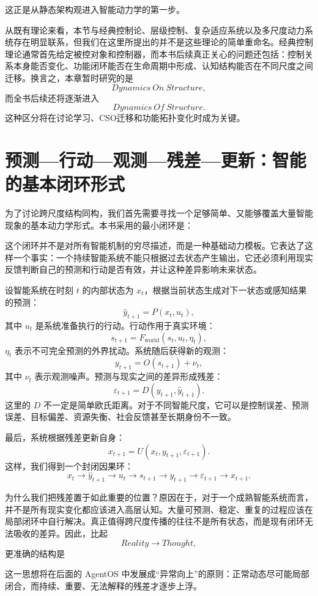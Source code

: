 这正是从静态架构观进入智能动力学的第一步。

从既有理论来看，本节与经典控制论、层级控制、复杂适应系统以及多尺度动力系统存在明显联系，但我们在这里所提出的并不是这些理论的简单重命名。经典控制理论通常首先给定被控对象和控制器，而本书后续真正关心的问题还包括：控制关系本身能否变化、功能闭环能否在生命周期中形成、认知结构能否在不同尺度之间迁移。换言之，本章暂时研究的是
\[
Dynamics\ On\ Structure,
\]
而全书后续还将逐渐进入
\[
Dynamics\ Of\ Structure.
\]
这种区分将在讨论学习、CSO迁移和功能拓扑变化时成为关键。

\section{预测---行动---观测---残差---更新：智能的基本闭环形式}

为了讨论跨尺度结构同构，我们首先需要寻找一个足够简单、又能够覆盖大量智能现象的基本动力学形式。本书采用的最小闭环是：
\begin{statementbox}
\centering
{}
\end{statementbox}
这个闭环并不是对所有智能机制的穷尽描述，而是一种基础动力模板。它表达了这样一个事实：一个持续智能系统不能只根据过去状态产生输出，它还必须利用现实反馈判断自己的预测和行动是否有效，并让这种差异影响未来状态。

设智能系统在时刻 $t$ 的内部状态为 $x_t$，根据当前状态生成对下一状态或感知结果的预测：
\[
\hat{y}_{t+1}
=
P(x_t,u_t),
\]
其中 $u_t$ 是系统准备执行的行动。行动作用于真实环境：
\[
s_{t+1}
=
F_{\mathrm{world}}(s_t,u_t,\eta_t),
\]
$\eta_t$ 表示不可完全预测的外界扰动。系统随后获得新的观测：
\[
y_{t+1}
=
O(s_{t+1})+\nu_t,
\]
其中 $\nu_t$ 表示观测噪声。预测与现实之间的差异形成残差：
\[
\varepsilon_{t+1}
=
D
\left(
y_{t+1},
\hat{y}_{t+1}
\right).
\]
这里的 $D$ 不一定是简单欧氏距离。对于不同智能尺度，它可以是控制误差、预测误差、目标偏差、资源失衡、社会反馈甚至长期身份不一致。

最后，系统根据残差更新自身：
\[
x_{t+1}
=
U(x_t,y_{t+1},\varepsilon_{t+1}).
\]
这样，我们得到一个封闭因果环：
\[
x_t
\rightarrow
\hat{y}_{t+1}
\rightarrow
u_t
\rightarrow
s_{t+1}
\rightarrow
y_{t+1}
\rightarrow
\varepsilon_{t+1}
\rightarrow
x_{t+1}.
\]

为什么我们把残差置于如此重要的位置？原因在于，对于一个成熟智能系统而言，并不是所有现实变化都应该进入高层认知。大量可预测、稳定、重复的过程应该在局部闭环中自行解决。真正值得跨尺度传播的往往不是所有状态，而是现有闭环无法吸收的差异。因此，比起
\[
Reality\rightarrow Thought,
\]
更准确的结构是
\begin{statementbox}
\centering
{}
\end{statementbox}
这一思想将在后面的 AgentOS 中发展成“异常向上”的原则：正常动态尽可能局部闭合，而持续、重要、无法解释的残差才逐步上浮。

